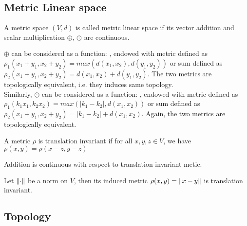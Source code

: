 \documentclass{article}
\begin{document}
\subsection{Metric Linear space}\label{Metric linear space}
\begin{definition}\rm\nextline
	A metric space $(V,d)$ is called metric linear space if its vector addition and scalar multiplication $\oplus$, $\odot$ are continuous.
\end{definition}


\begin{remark}\rm\nextline
	$\oplus$ can be considered as a function: , endowed with metric  defined as $\rho_1(x_1+y_1,x_2+y_2)=max(d(x_1,x_2),d(y_1,y_2))$
	or sum  defined as $\rho_2(x_1+y_1,x_2+y_2)=d(x_1,x_2)+d(y_1,y_2)$. The two metrics are topologically equivalent, i.e. they induces same topology.\\
	Similarly, $\odot$ can be considered as a function: , endowed with metric  defined as $\rho_1(k_1x_1,k_2x_2)=max(|k_1-k_2|,d(x_1,x_2))$
	or sum  defined as $\rho_2(x_1+y_1,x_2+y_2)=|k_1-k_2|+d(x_1,x_2)$. Again, the two metrics are topologically equivalent.
\end{remark}

\begin{definition}\rm\nextline
	A metric $\rho$ is translation invariant if for all $x,y,z\in V$, we have  $\rho(x,y)=\rho(x-z,y-z)$
\end{definition}

\begin{proposition}\rm\nextline
	Addition is continuous with respect to translation invariant metic.
\end{proposition}

\begin{proposition}\rm\nextline
	Let $\left\|{\cdot}\right\|$ be a norm on $V$, then its induced metric $\rho(x,y)=\left\|{x-y}\right\|$ is translation invariant. %
\end{proposition}

\subsection{Topology}\label{topology}
\end{document}
